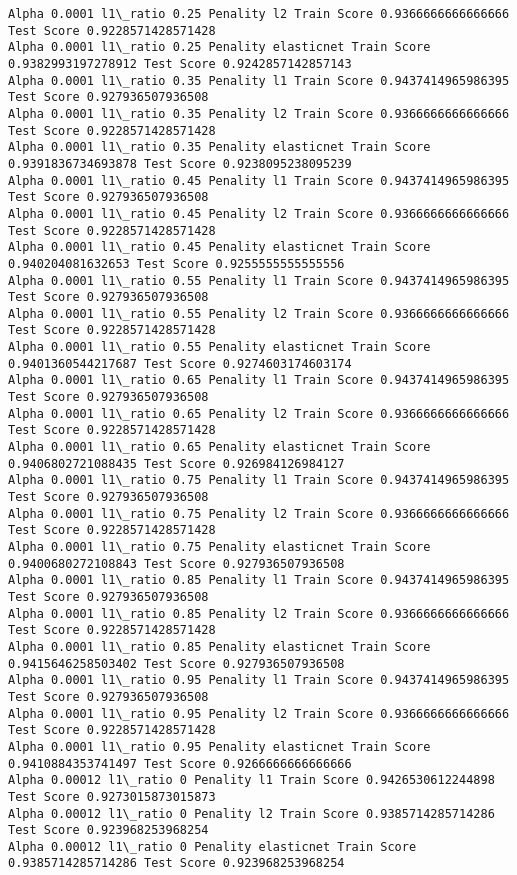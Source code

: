 \documentclass[11pt]{article}
\begin{document}
\begin{Verbatim}[commandchars=\\\{\}]
Alpha 0.0001 l1\_ratio 0.25 Penality l2 Train Score 0.9366666666666666 Test Score 0.9228571428571428
Alpha 0.0001 l1\_ratio 0.25 Penality elasticnet Train Score 0.9382993197278912 Test Score 0.9242857142857143
Alpha 0.0001 l1\_ratio 0.35 Penality l1 Train Score 0.9437414965986395 Test Score 0.927936507936508
Alpha 0.0001 l1\_ratio 0.35 Penality l2 Train Score 0.9366666666666666 Test Score 0.9228571428571428
Alpha 0.0001 l1\_ratio 0.35 Penality elasticnet Train Score 0.9391836734693878 Test Score 0.9238095238095239
Alpha 0.0001 l1\_ratio 0.45 Penality l1 Train Score 0.9437414965986395 Test Score 0.927936507936508
Alpha 0.0001 l1\_ratio 0.45 Penality l2 Train Score 0.9366666666666666 Test Score 0.9228571428571428
Alpha 0.0001 l1\_ratio 0.45 Penality elasticnet Train Score 0.940204081632653 Test Score 0.9255555555555556
Alpha 0.0001 l1\_ratio 0.55 Penality l1 Train Score 0.9437414965986395 Test Score 0.927936507936508
Alpha 0.0001 l1\_ratio 0.55 Penality l2 Train Score 0.9366666666666666 Test Score 0.9228571428571428
Alpha 0.0001 l1\_ratio 0.55 Penality elasticnet Train Score 0.9401360544217687 Test Score 0.9274603174603174
Alpha 0.0001 l1\_ratio 0.65 Penality l1 Train Score 0.9437414965986395 Test Score 0.927936507936508
Alpha 0.0001 l1\_ratio 0.65 Penality l2 Train Score 0.9366666666666666 Test Score 0.9228571428571428
Alpha 0.0001 l1\_ratio 0.65 Penality elasticnet Train Score 0.9406802721088435 Test Score 0.926984126984127
Alpha 0.0001 l1\_ratio 0.75 Penality l1 Train Score 0.9437414965986395 Test Score 0.927936507936508
Alpha 0.0001 l1\_ratio 0.75 Penality l2 Train Score 0.9366666666666666 Test Score 0.9228571428571428
Alpha 0.0001 l1\_ratio 0.75 Penality elasticnet Train Score 0.9400680272108843 Test Score 0.927936507936508
Alpha 0.0001 l1\_ratio 0.85 Penality l1 Train Score 0.9437414965986395 Test Score 0.927936507936508
Alpha 0.0001 l1\_ratio 0.85 Penality l2 Train Score 0.9366666666666666 Test Score 0.9228571428571428
Alpha 0.0001 l1\_ratio 0.85 Penality elasticnet Train Score 0.9415646258503402 Test Score 0.927936507936508
Alpha 0.0001 l1\_ratio 0.95 Penality l1 Train Score 0.9437414965986395 Test Score 0.927936507936508
Alpha 0.0001 l1\_ratio 0.95 Penality l2 Train Score 0.9366666666666666 Test Score 0.9228571428571428
Alpha 0.0001 l1\_ratio 0.95 Penality elasticnet Train Score 0.9410884353741497 Test Score 0.9266666666666666
Alpha 0.00012 l1\_ratio 0 Penality l1 Train Score 0.9426530612244898 Test Score 0.9273015873015873
Alpha 0.00012 l1\_ratio 0 Penality l2 Train Score 0.9385714285714286 Test Score 0.923968253968254
Alpha 0.00012 l1\_ratio 0 Penality elasticnet Train Score 0.9385714285714286 Test Score 0.923968253968254

\end{Verbatim}
\end{document}
